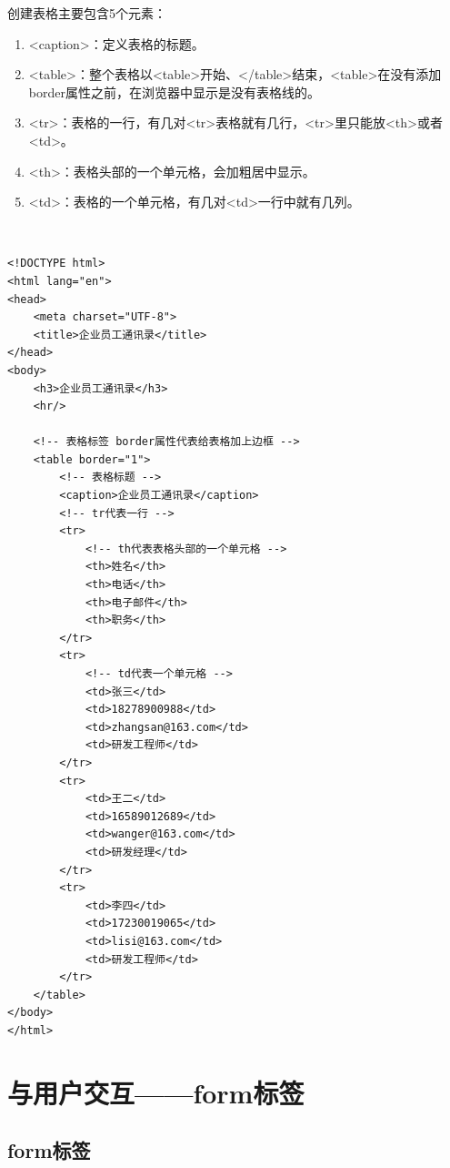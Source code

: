 创建表格主要包含5个元素：

\begin{enumerate}
	\item <caption>：定义表格的标题。

	\item <table>：整个表格以<table>开始、</table>结束，<table>在没有添加border属性之前，在浏览器中显示是没有表格线的。

	\item <tr>：表格的一行，有几对<tr>表格就有几行，<tr>里只能放<th>或者<td>。

	\item <th>：表格头部的一个单元格，会加粗居中显示。

	\item <td>：表格的一个单元格，有几对<td>一行中就有几列。
\end{enumerate}

 \\
\begin{lstlisting}[style=htmlcssjs]
<!DOCTYPE html>
<html lang="en">
<head>
    <meta charset="UTF-8">
    <title>企业员工通讯录</title>
</head>
<body>
    <h3>企业员工通讯录</h3>
    <hr/>

    <!-- 表格标签 border属性代表给表格加上边框 -->
    <table border="1">
        <!-- 表格标题 -->
        <caption>企业员工通讯录</caption>
        <!-- tr代表一行 -->
        <tr>
            <!-- th代表表格头部的一个单元格 -->
            <th>姓名</th>
            <th>电话</th>
            <th>电子邮件</th>
            <th>职务</th>
        </tr>
        <tr>
            <!-- td代表一个单元格 -->
            <td>张三</td>
            <td>18278900988</td>
            <td>zhangsan@163.com</td>
            <td>研发工程师</td>
        </tr>
        <tr>
            <td>王二</td>
            <td>16589012689</td>
            <td>wanger@163.com</td>
            <td>研发经理</td>
        </tr>
        <tr>
            <td>李四</td>
            <td>17230019065</td>
            <td>lisi@163.com</td>
            <td>研发工程师</td>
        </tr>
    </table>
</body>
</html>
\end{lstlisting}

\newpage

\section{与用户交互——form标签}

\subsection{form标签}

